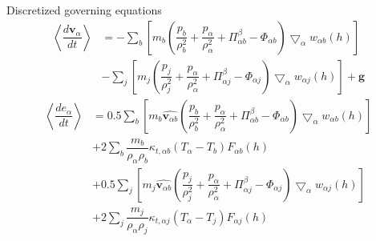 \documentclass{beamer}
\begin{document}
\begin{frame}{Discretized governing equations}
\begin{equation}
\begin{split}
\left\langle\dfrac{d \textbf{v}_{\alpha}}{d t}\right\rangle 
& =-\sum_b \left[ m_b \left(\dfrac{p_b}{\rho_b^2} + \dfrac{p_{\alpha}}{\rho_{\alpha}^2} + \Pi_{\alpha b}^{\beta} - \Phi_{\alpha b}\right) \bigtriangledown_{\alpha}w_{\alpha b}\left(h\right)\right] \\
& -\sum_j \left[m_j \left(\dfrac{p_j}{\rho_j^2} + \dfrac{p_{\alpha}}{\rho_{\alpha}^2} + \Pi_{\alpha j}^{\beta} - \Phi_{\alpha j}\right) \bigtriangledown_{\alpha}w_{\alpha j}\left(h\right)\right]
+\textbf{g}
\end{split}
\label{eq:gov-sph-v}
\end{equation}
\begin{equation}
\begin{split}
\left\langle\dfrac{d e_{\alpha}}{d t}\right\rangle
& = 0.5\sum_b \left[m_b \widehat{\textbf{v}_{\alpha b}}\left(\dfrac{p_b}{\rho_b^2} + \dfrac{p_{\alpha}}{\rho_{\alpha}^2} + \Pi_{\alpha b}^{\beta} - \Phi_{\alpha b}\right) \bigtriangledown_{\alpha}w_{\alpha b}\left(h\right)\right] \\
& + 2 \sum_b \dfrac{m_b}{\rho_{\alpha} \rho_b} \kappa_{t,\alpha b} \left(T_{\alpha} - T_b\right) F_{\alpha b} \left(h\right) \\
& +0.5\sum_j \left[m_j \widehat{\textbf{v}_{\alpha b}}\left(\dfrac{p_j}{\rho_j^2} + \dfrac{p_{\alpha}}{\rho_{\alpha}^2} + \Pi_{\alpha j}^{\beta} - \Phi_{\alpha j}\right) \bigtriangledown_{\alpha}w_{\alpha j}\left(h\right)\right] \\
& + 2 \sum_j \dfrac{m_j}{\rho_{\alpha} \rho_j} \kappa_{t,\alpha j} \left(T_{\alpha} - T_j\right) F_{\alpha j} \left(h\right)
\end{split}
\label{eq:gov-sph-e}
\end{equation}
\end{frame}
\end{document}
